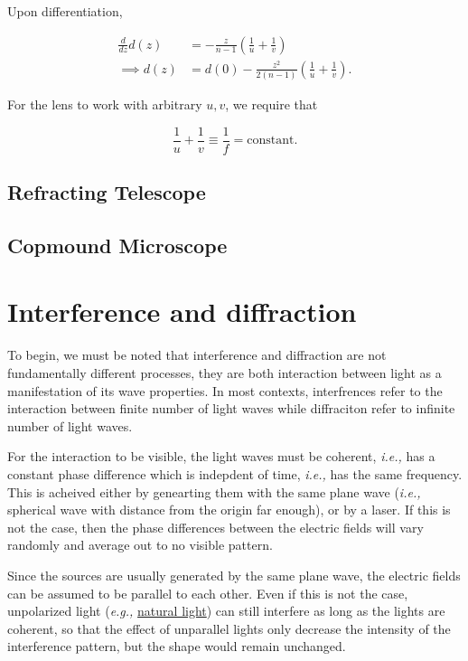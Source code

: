 \documentclass[english,a4paper,12pt]{report}
\begin{document}
Upon differentiation, 

\begin{equation}
    \begin{aligned} 
    \frac{d}{dz}d(z) &= -\frac{z}{n-1}(\frac{1}{u} + \frac{1}{v}  ) \\
    \implies  d(z) &= d(0) - \frac{z^2}{2(n-1)} \left( \frac{1}{u} + \frac{1}{v}   \right).   
    \end{aligned} 
\end{equation}

For the lens to work with arbitrary \(u, v\), we require that 

\begin{equation}
    \frac{1}{u} + \frac{1}{v} \equiv \frac{1}{f} = \text{constant}.    
\end{equation}





\section{Refracting Telescope}

\section{Copmound Microscope}

\chapter{Interference and diffraction}

To begin, we must be noted that interference and diffraction are not fundamentally different processes, they are both interaction between light as a manifestation of its wave properties. In most contexts, interfrences refer to the interaction between finite number of light waves while diffraciton refer to infinite number of light waves.

For the interaction to be visible, the light waves must be coherent, \textit{i.e.,} has a constant phase difference which is indepdent of time, \textit{i.e.,} has the same frequency. This is acheived either by genearting them with the same plane wave (\textit{i.e.,} spherical wave with distance from the origin far enough), or by a laser. If this is not the case, then the phase differences between the electric fields will vary randomly and average out to no visible pattern.

Since the sources are usually generated by the same plane wave, the electric fields can be assumed to be parallel to each other. Even if this is not the case, unpolarized light (\textit{e.g.,} \href{https://www.youtube.com/watch?v=Iuv6hY6zsd0&t=326s}{natural light}) can still interfere as long as the lights are coherent, so that the effect of unparallel lights only decrease the intensity of the interference pattern, but the shape would remain unchanged.  
\end{document}
